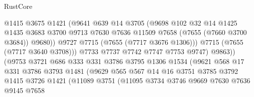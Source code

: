 \begin{lexlean}{RustCore}
\begin{coremodule}
                                @1415
                                @3675
                                @1421
                                (@9641
                                  @639
                                  @14
                                  @3705
                                  (@9698
                                    @102
                                    @32
                                    @14
                                    @1425
                                    @1435
                                    @3683
                                    @3700
                                    @9713
                                    @7630
                                    @7636
                                    @11509
                                    @7658
                                    (@7655 (@7660 @3700 @3684))
                                    @9680))
                                @9727
                                @7715
                                (@7655 (@7717 @3676 @1306)))
                              @7715
                              (@7655 (@7717 @3640 @3708)))
                            @7733
                            @7737
                            @7742
                            @7747
                            @7753
                            @9747)
                          @9863))
                      (@9753
                        @3721
                        @686
                        @333
                        @331
                        @3786
                        @3795
                        @1306
                        @1534
                        (@9621
                          @568
                          @17
                          @331
                          @3786
                          @3793
                          @1481
                          (@9629
                            @565
                            @567
                            @14
                            @16
                            @3751
                            @3785
                            @3792
                            @1415
                            @3726
                            @1421
                            (@11089
                              @3751
                              (@11095
                                @3734
                                @3746
                                @9669
                                @7630
                                @7636
                                @9145
                                @7658

\end{coremodule}
\end{lexlean}
